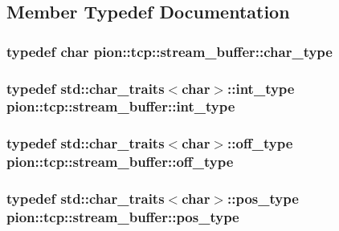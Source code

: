 \subsection{Member Typedef Documentation}
\hypertarget{classpion_1_1tcp_1_1stream__buffer_a1fa60cd7dbf11eebb2983fe2a115a2e4}{
\subsubsection[{char\-\_\-type}]{\setlength{\rightskip}{0pt plus 5cm}typedef char {\bf pion\-::tcp\-::stream\-\_\-buffer\-::char\-\_\-type}}}\label{classpion_1_1tcp_1_1stream__buffer_a1fa60cd7dbf11eebb2983fe2a115a2e4}
\hypertarget{classpion_1_1tcp_1_1stream__buffer_a7dcf4943671520d4018b4468c336e86e}{
\subsubsection[{int\-\_\-type}]{\setlength{\rightskip}{0pt plus 5cm}typedef std\-::char\-\_\-traits$<$char$>$\-::{\bf int\-\_\-type} {\bf pion\-::tcp\-::stream\-\_\-buffer\-::int\-\_\-type}}}\label{classpion_1_1tcp_1_1stream__buffer_a7dcf4943671520d4018b4468c336e86e}
\hypertarget{classpion_1_1tcp_1_1stream__buffer_ac9b79dc64ad2b3e76c121b00ffc6e951}{
\subsubsection[{off\-\_\-type}]{\setlength{\rightskip}{0pt plus 5cm}typedef std\-::char\-\_\-traits$<$char$>$\-::{\bf off\-\_\-type} {\bf pion\-::tcp\-::stream\-\_\-buffer\-::off\-\_\-type}}}\label{classpion_1_1tcp_1_1stream__buffer_ac9b79dc64ad2b3e76c121b00ffc6e951}
\hypertarget{classpion_1_1tcp_1_1stream__buffer_a3d24ccbacf44098151258b4219f3730c}{
\subsubsection[{pos\-\_\-type}]{\setlength{\rightskip}{0pt plus 5cm}typedef std\-::char\-\_\-traits$<$char$>$\-::{\bf pos\-\_\-type} {\bf pion\-::tcp\-::stream\-\_\-buffer\-::pos\-\_\-type}}}\label{classpion_1_1tcp_1_1stream__buffer_a3d24ccbacf44098151258b4219f3730c}
